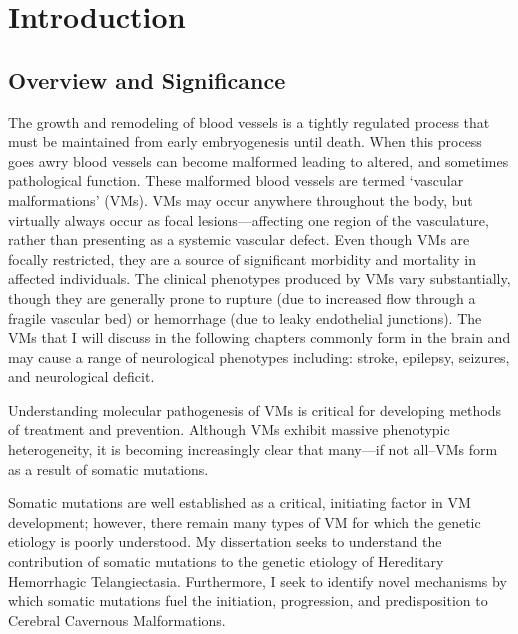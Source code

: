 \chapter{Introduction}
\label{chap:intro}

\clearpage



\section{Overview and Significance}
The growth and remodeling of blood vessels is a tightly regulated process that must be maintained from early embryogenesis until death. When this process goes awry blood vessels can become malformed leading to altered, and sometimes pathological function. These malformed blood vessels are termed `vascular malformations' (VMs). VMs may occur anywhere throughout the body, but virtually always occur as focal lesions---affecting one region of the vasculature, rather than presenting as a systemic vascular defect. Even though VMs are focally restricted, they are a source of significant morbidity and mortality in affected individuals. The clinical phenotypes produced by VMs vary substantially, though they are generally prone to rupture (due to increased flow through a fragile vascular bed) or hemorrhage (due to leaky endothelial junctions). The VMs that I will discuss in the following chapters commonly form in the brain and may cause a range of neurological phenotypes including: stroke, epilepsy, seizures, and neurological deficit.

Understanding molecular pathogenesis of VMs is critical for developing methods of treatment and prevention. Although VMs exhibit massive phenotypic heterogeneity, it is becoming increasingly clear that many---if not all--VMs form as a result of somatic mutations.

Somatic mutations are well established as a critical, initiating factor in VM development; however, there remain many types of VM for which the genetic etiology is poorly understood. My dissertation seeks to understand the contribution of somatic mutations to the genetic etiology of Hereditary Hemorrhagic Telangiectasia. Furthermore, I seek to identify novel mechanisms by which somatic mutations fuel the initiation, progression, and predisposition to Cerebral Cavernous Malformations. 

